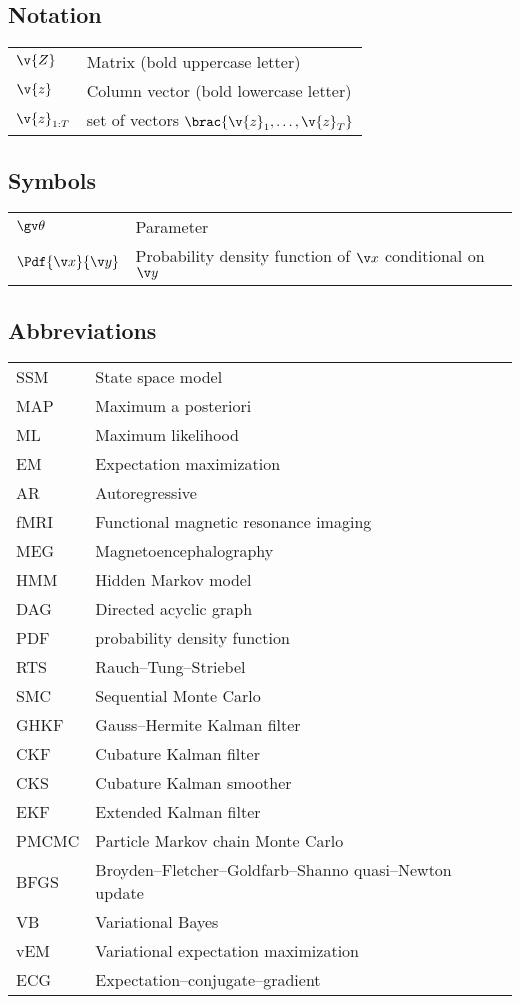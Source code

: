 \subsection*{Notation}
\begin{tabular}{ll}
$\v{Z}$  & Matrix (bold uppercase letter)  \\
$\v{z}$ & Column vector (bold lowercase letter) \\
$\v{z}_{1:T}$    & set of vectors $\brac{\v{z}_1,\dots,\v{z}_T}$
\end{tabular}


\subsection*{Symbols}

\begin{tabular}{ll}
$\Th$            & Parameter\\
$\Pdf{\x}{\y}$   & Probability density function of $\x$ conditional on $\y$
\end{tabular}

\subsection*{Abbreviations}

\begin{tabular}{ll}
SSM & State space model \\
MAP & Maximum a posteriori \\
ML & Maximum likelihood \\
EM & Expectation maximization \\
AR & Autoregressive \\
fMRI & Functional magnetic resonance imaging \\
MEG & Magnetoencephalography \\
HMM & Hidden Markov model \\
DAG & Directed acyclic graph \\
PDF & probability density function \\
RTS & Rauch--Tung--Striebel \\
SMC & Sequential Monte Carlo \\
GHKF & Gauss--Hermite Kalman filter \\
CKF & Cubature Kalman filter \\
CKS & Cubature Kalman smoother \\
EKF & Extended Kalman filter \\
PMCMC & Particle Markov chain Monte Carlo \\
BFGS & Broyden--Fletcher--Goldfarb--Shanno quasi--Newton update\\
VB & Variational Bayes \\
vEM & Variational expectation maximization \\
ECG & Expectation--conjugate--gradient
\end{tabular}